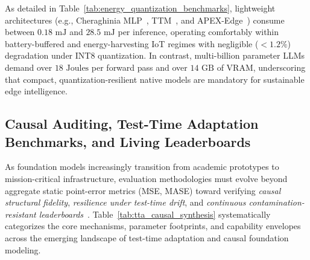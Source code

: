 As detailed in Table~\ref{tab:energy_quantization_benchmarks}, lightweight architectures (e.g., Cheraghinia MLP~\cite{cheraghinia2025lightweight}, TTM~\cite{ekambaram2024ttm}, and APEX-Edge~\cite{pradhan2026apex}) consume between $0.18\text{ mJ}$ and $28.5\text{ mJ}$ per inference, operating comfortably within battery-buffered and energy-harvesting IoT regimes with negligible ($<1.2\%$) degradation under INT8 quantization. In contrast, multi-billion parameter LLMs demand over $18\text{ Joules}$ per forward pass and over $14\text{ GB}$ of VRAM, underscoring that compact, quantization-resilient native models are mandatory for sustainable edge intelligence.

\subsection{Causal Auditing, Test-Time Adaptation Benchmarks, and Living Leaderboards}
\label{sec:causal_audits_living_benchmarks}

As foundation models increasingly transition from academic prototypes to mission-critical infrastructure, evaluation methodologies must evolve beyond aggregate static point-error metrics (MSE, MASE) toward verifying \emph{causal structural fidelity}, \emph{resilience under test-time drift}, and \emph{continuous contamination-resistant leaderboards}~\cite{jander2026causal,wang2026principled}. Table~\ref{tab:tta_causal_synthesis} systematically categorizes the core mechanisms, parameter footprints, and capability envelopes across the emerging landscape of test-time adaptation and causal foundation modeling.

